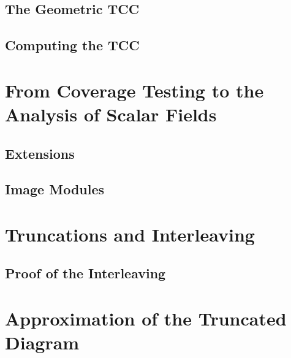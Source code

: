 \documentclass[12pt]{article}
\begin{document}
\clearpage



\subsection{The Geometric TCC}\label{sec:geo_tcc}


\subsection{Computing the TCC}
  


\clearpage
\section{From Coverage Testing to the Analysis of Scalar Fields}\label{sec:middle}
%


\subsection{Extensions}
  

\subsection{Image Modules}


\clearpage
\section{Truncations and Interleaving}\label{sec:interleaving}




\subsection{Proof of the Interleaving}
  


\clearpage
\section{Approximation of the Truncated Diagram}\label{sec:truncations}
  
\end{document}
